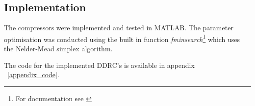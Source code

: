 \documentclass[../main2.tex]{subfiles}
\begin{document}
\subsection{Implementation} \label{method_implementation}
The compressors were implemented and tested in MATLAB\textsuperscript{\textregistered}. The parameter optimisation was conducted using the built in function \emph{fminsearch}\footnote{For documentation see \cite{fminsearch}} which uses the Nelder-Mead simplex algorithm. 

The code for the implemented DDRC's is available in appendix ~\ref{appendix_code}.
%
%
%
\end{document}
